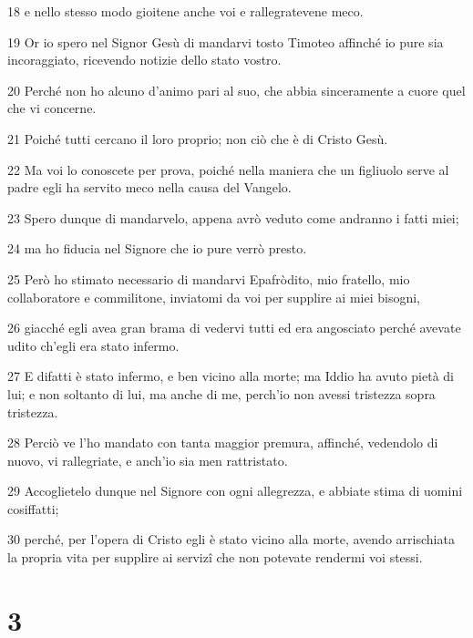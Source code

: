 \par 18 e nello stesso modo gioitene anche voi e rallegratevene meco.
\par 19 Or io spero nel Signor Gesù di mandarvi tosto Timoteo affinché io pure sia incoraggiato, ricevendo notizie dello stato vostro.
\par 20 Perché non ho alcuno d'animo pari al suo, che abbia sinceramente a cuore quel che vi concerne.
\par 21 Poiché tutti cercano il loro proprio; non ciò che è di Cristo Gesù.
\par 22 Ma voi lo conoscete per prova, poiché nella maniera che un figliuolo serve al padre egli ha servito meco nella causa del Vangelo.
\par 23 Spero dunque di mandarvelo, appena avrò veduto come andranno i fatti miei;
\par 24 ma ho fiducia nel Signore che io pure verrò presto.
\par 25 Però ho stimato necessario di mandarvi Epafròdito, mio fratello, mio collaboratore e commilitone, inviatomi da voi per supplire ai miei bisogni,
\par 26 giacché egli avea gran brama di vedervi tutti ed era angosciato perché avevate udito ch'egli era stato infermo.
\par 27 E difatti è stato infermo, e ben vicino alla morte; ma Iddio ha avuto pietà di lui; e non soltanto di lui, ma anche di me, perch'io non avessi tristezza sopra tristezza.
\par 28 Perciò ve l'ho mandato con tanta maggior premura, affinché, vedendolo di nuovo, vi rallegriate, e anch'io sia men rattristato.
\par 29 Accoglietelo dunque nel Signore con ogni allegrezza, e abbiate stima di uomini cosiffatti;
\par 30 perché, per l'opera di Cristo egli è stato vicino alla morte, avendo arrischiata la propria vita per supplire ai servizî che non potevate rendermi voi stessi.

\chapter{3}

